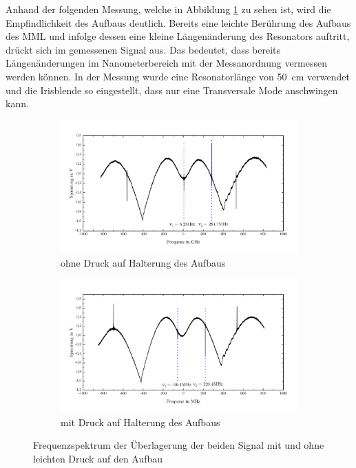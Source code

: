 \documentclass[a4paper,twoside,final]{article}
\begin{document}
%
Anhand der folgenden Messung, welche in Abbildung \ref{fig:berührung} zu sehen ist, wird die Empfindlichkeit des Aufbaus deutlich. Bereits eine leichte Berührung des Aufbaus des MML und infolge dessen eine kleine Längenänderung des Resonators auftritt, drückt sich im gemessenen Signal aus. Das bedeutet, dass bereits Längenänderungen im Nanometerbereich mit der Messanordnung vermessen werden können. In der Messung wurde eine Resonatorlänge von \SI{50}{\centi\meter} verwendet und die Irisblende so eingestellt, dass nur eine Transversale Mode anschwingen kann.

\begin{figure}[htp]
  \centering
  \begin{subfigure}{0.8\textwidth}
    \includegraphics[width=\textwidth]{Bilder/ungedrueckt_50cm_1Mode.pdf}
    \caption{ohne Druck auf Halterung des Aufbaus}
  \end{subfigure}
  \begin{subfigure}{0.8\textwidth}
    \includegraphics[width=\textwidth]{Bilder/gedrueckt_50cm_1Mode.pdf}
    \caption{mit Druck auf Halterung des Aufbaus}
  \end{subfigure}
  \caption{Frequenzspektrum der Überlagerung der beiden Signal mit und ohne leichten Druck auf den Aufbau}
  \label{fig:berührung}
\end{figure}
\end{document}
